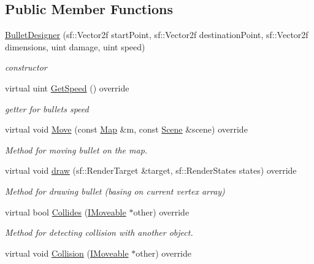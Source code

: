 \subsection*{Public Member Functions}
\begin{DoxyCompactItemize}
\item 
\mbox{\hyperlink{class_bullet_designer_a4712950e2c64aaea2fe446855e8ec2d2}{Bullet\+Designer}} (sf\+::\+Vector2f start\+Point, sf\+::\+Vector2f destination\+Point, sf\+::\+Vector2f dimensions, uint damage, uint speed)
\begin{DoxyCompactList}\small\item\em constructor \end{DoxyCompactList}\item 
virtual uint \mbox{\hyperlink{class_bullet_designer_ab780d9e61cd46d6e2d1f73ad5144cb42}{Get\+Speed}} () override
\begin{DoxyCompactList}\small\item\em getter for bullet\textquotesingle{}s speed \end{DoxyCompactList}\item 
virtual void \mbox{\hyperlink{class_bullet_designer_a94ddb07bc126b159abc4cfedf27e18b7}{Move}} (const \mbox{\hyperlink{class_map}{Map}} \&m, const \mbox{\hyperlink{class_scene}{Scene}} \&scene) override
\begin{DoxyCompactList}\small\item\em Method for moving bullet on the map. \end{DoxyCompactList}\item 
virtual void \mbox{\hyperlink{class_bullet_designer_a5f920adb548d1e7d5e99394bebc08ec1}{draw}} (sf\+::\+Render\+Target \&target, sf\+::\+Render\+States states) override
\begin{DoxyCompactList}\small\item\em Method for drawing bullet (basing on current vertex array) \end{DoxyCompactList}\item 
virtual bool \mbox{\hyperlink{class_bullet_designer_a3ce40c948e1adcb694a1be0c10de0380}{Collides}} (\mbox{\hyperlink{class_i_moveable}{I\+Moveable}} $\ast$other) override
\begin{DoxyCompactList}\small\item\em Method for detecting collision with another object. \end{DoxyCompactList}\item 
virtual void \mbox{\hyperlink{class_bullet_designer_a360def48f566d8c863b1355b1cb69bad}{Collision}} (\mbox{\hyperlink{class_i_moveable}{I\+Moveable}} $\ast$other) override

\end{DoxyCompactItemize}
